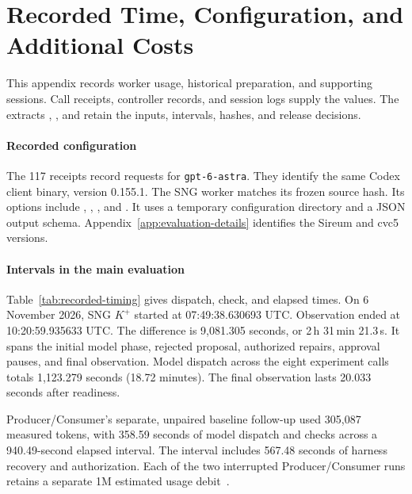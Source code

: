 \section{Recorded Time, Configuration, and Additional Costs}
\label{app:resource-details}
\suppressfloats[t]
This appendix records worker usage, historical preparation, and supporting sessions. Call receipts, controller records, and session logs supply the values. The extracts , , and  retain the inputs, intervals, hashes, and release decisions.

\paragraph{Recorded configuration}
The 117 receipts record requests for \texttt{gpt-6-astra}. They identify the same Codex client binary, version 0.155.1. The SNG worker matches its frozen source hash. Its options include , , , and . It uses a temporary configuration directory and a JSON output schema. Appendix~\ref{app:evaluation-details} identifies the Sireum and cvc5 versions.

\paragraph{Intervals in the main evaluation}
Table~\ref{tab:recorded-timing} gives dispatch, check, and elapsed times. On 6 November 2026, SNG $K^{+}$ started at 07:49:38.630693 UTC. Observation ended at 10:20:59.935633 UTC. The difference is 9,081.305 seconds, or 2\,h 31\,min 21.3\,s. It spans the initial model phase, rejected proposal, authorized repairs, approval pauses, and final observation. Model dispatch across the eight experiment calls totals 1,123.279 seconds (18.72 minutes). The final observation lasts 20.033 seconds after readiness.

Producer/Consumer's separate, unpaired baseline follow-up used 305,087 measured tokens, with 358.59 seconds of model dispatch and checks across a 940.49-second elapsed interval. The interval includes 567.48 seconds of harness recovery and authorization. Each of the two interrupted Producer/Consumer runs retains a separate 1M estimated usage debit~\cite{producerConsumerConsolidatedReport2026}.

